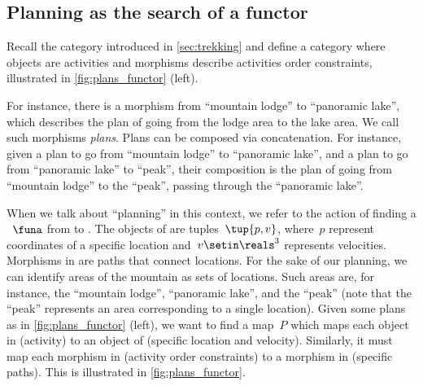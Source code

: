 
\subsection{Planning as the search of a functor}

\begin{example}
    \label{ex:planning-as-search-functor}
    Recall the category \Berg introduced in \cref{sec:trekking} and define a category \Plans where objects are activities and morphisms describe activities order constraints, illustrated in \cref{fig:plans_functor} (left).

    For instance, there is a morphism from ``mountain lodge'' to ``panoramic lake'', which describes the plan of going from the lodge area to the lake area.
    We call such morphisms \emph{plans}.
    Plans can be composed via concatenation.
    For instance, given a plan to go from ``mountain lodge'' to ``panoramic lake'', and a plan to go from ``panoramic lake'' to ``peak'', their composition is the plan of going from ``mountain lodge'' to the ``peak'', passing through the ``panoramic lake''.

    When we talk about ``planning'' in this context, we refer to the action of finding a ~$\funa$ from \Plans to \Berg.
    The objects of \Berg are tuples~$\tup{p,v}$, where~$p$ represent coordinates of a specific location and~$v\setin \reals^3$ represents velocities.
    Morphisms in \Berg are paths that connect locations.
    For the sake of our planning, we can identify areas of the mountain as sets of locations.
    Such areas are, for instance, the ``mountain lodge'', ``panoramic lake'', and the
    ``peak'' (note that the ``peak'' represents an area corresponding to a single location).
    Given some plans as in \cref{fig:plans_functor} (left), we want to find a map~$P$ which maps each object in \Plans (activity) to an object of \Berg (specific location and velocity).
    Similarly, it must map each morphism in \Plans (activity order constraints) to a morphism in \Berg (specific paths).
    This is illustrated in \cref{fig:plans_functor}.
\end{example}


